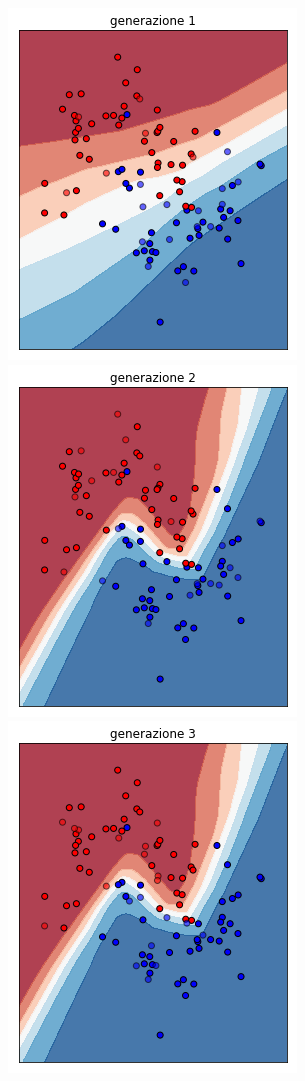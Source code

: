 \documentclass[12pt,a4paper]{report}
\begin{document}
\begin{figure}[H]
 \centering
 \includegraphics[scale = 0.35]{images/moons-rnd-acc./1}
 \includegraphics[scale = 0.35]{images/moons-rnd-acc./2}
 \includegraphics[scale = 0.35]{images/moons-rnd-acc./3}

\end{figure}
\end{document}
